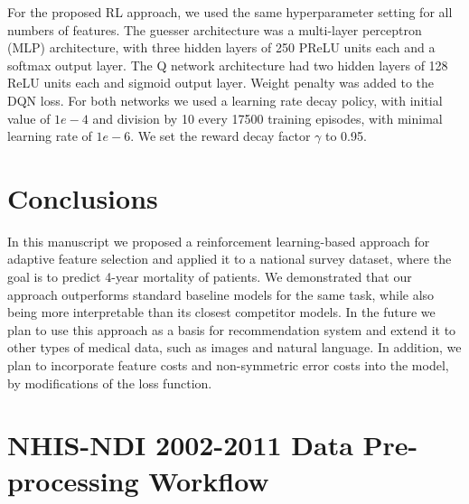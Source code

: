 \documentclass[reqno,11pt]{article}
\begin{document}
For the proposed RL approach, we used the same hyperparameter setting for all numbers of features.
The guesser architecture was a multi-layer perceptron (MLP) architecture, with three hidden layers of 250 PReLU units each and a softmax output layer.
The Q network architecture had two hidden layers of 128 ReLU units each and sigmoid output layer.
Weight penalty was added to the DQN loss.
For both networks we used a learning rate decay policy, with initial value of $1e-4$ and division by 10 every 17500 training episodes, with minimal learning rate of $1e-6$.
We set the reward decay factor $\gamma$ to 0.95.

\section {Conclusions}\label{sec:conclusions}

In this manuscript we proposed a reinforcement learning-based approach for adaptive feature selection and applied it to a  national survey dataset, where the goal is to predict 4-year mortality of patients.
We demonstrated that our approach outperforms standard baseline models for the same task, while also being more interpretable than its closest competitor models.
In the future we plan to use this approach as a basis for recommendation system and extend it to other types of medical data, such as images and natural language.
In addition, we plan  to incorporate feature costs and non-symmetric error costs into the model, by modifications of the loss function.



\appendix

\section {NHIS-NDI 2002-2011 Data Pre-processing Workflow}\label{sec:dpw}
\end{document}
